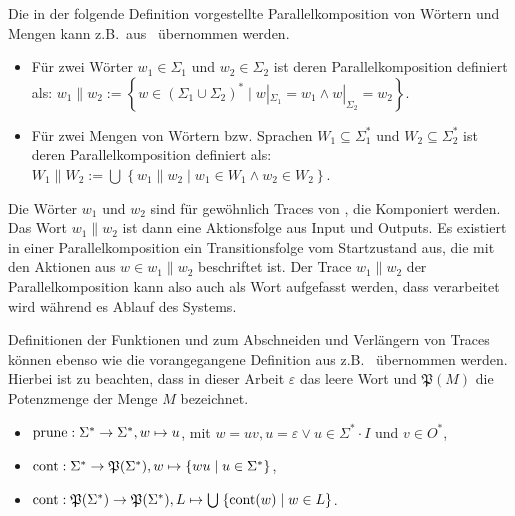 Die in der folgende Definition vorgestellte Parallelkomposition von Wörtern und
Mengen kann z.B.\ aus~\cite{Vogler2014EIO} übernommen werden.

\begin{Def}\mbox{}
  \begin{itemize}
    \item Für zwei Wörter $w_1\in\Sigma _1$ und $w_2\in\Sigma _2$ ist
      deren Parallelkomposition definiert als: $w_1\| w_2:=\left\{w\in
      (\Sigma _1\cup\Sigma _2)^*\mid w|_{\Sigma _1}=w_1\wedge w|_{\Sigma
    _2}=w_2\right\}$.
    \item Für zwei Mengen von Wörtern bzw. Sprachen $W_1\subseteq \Sigma
      ^*_1$ und $W_2\subseteq \Sigma ^*_2$ ist deren Parallelkomposition
      definiert als: $W_1\| W_2:=\bigcup\hspace{1pt}\left\{w_1\| w_2\mid
      w_1\in W_1\wedge w_2\in W_2\right\}$.
  \end{itemize}
\end{Def}

Die Wörter $w_1$ und $w_2$ sind für gewöhnlich Traces von \MEIO{}, die
Komponiert werden. Das Wort $w_1\|w_2$ ist dann eine Aktionsfolge aus Input und
Outputs. Es existiert in einer Parallelkomposition ein Transitionsfolge vom
Startzustand aus, die mit den Aktionen aus $w\in w_1\|w_2$ beschriftet ist. Der
Trace $w_1\|w_2$ der Parallelkomposition kann also auch als Wort aufgefasst
werden, dass verarbeitet wird während es Ablauf des Systems.

Definitionen der Funktionen \prune{} und \cont{} zum Abschneiden und Verlängern
von Traces können ebenso wie die vorangegangene Definition aus
z.B.~\cite{Vogler2014EIO} übernommen werden. Hierbei ist zu beachten, dass in
dieser Arbeit $\varepsilon$ das leere Wort und $\mathfrak{P}(M)$ die
Potenzmenge der Menge $M$ bezeichnet.

\begin{Def}\mbox{}
  \begin{itemize}
    \item $\mathrm{prune}{}:\Sigma ^*\rightarrow\Sigma ^*, w\mapsto u$, mit $w=uv,
      u=\varepsilon\vee u\in\Sigma ^*\cdot I$ und $v\in O^*$,
    \item $\mathrm{cont}{}:\Sigma ^*\rightarrow\mathfrak{P}(\Sigma ^*),
      w\mapsto\left\{wu\mid u\in\Sigma ^*\right\}$,
    \item $\mathrm{cont}{}:\mathfrak{P}(\Sigma ^*)\rightarrow\mathfrak{P}(\Sigma ^*),
      L\mapsto\bigcup\hspace{1pt}\left\{\mathrm{cont}{}(w)\mid w\in L\right\}$.
  \end{itemize}
\end{Def}

